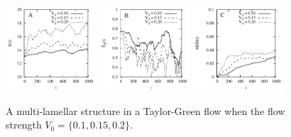 \documentclass[aps,prl,preprint,groupedaddress]{revtex4-2}
\begin{document}
\begin{figure}
  \begin{center}
  \includegraphics[width=0.3\textwidth]{MTG_E.pdf}
   \includegraphics[width=0.3\textwidth]{MTG_LOP.pdf}
    \includegraphics[width=0.3\textwidth]{MTG_MSD.pdf}
  \end{center}
    \caption{A multi-lamellar structure in a Taylor-Green flow when the flow strength $V_0=\{0.1,0.15,0.2\}$. }
\end{figure}
\end{document}
